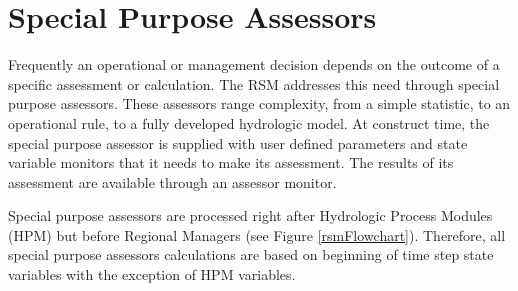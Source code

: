 \section{Special Purpose Assessors}\label{Chapter:specialPurposeAssessor}

Frequently an operational or management decision depends on the
outcome of a specific assessment or calculation.  The RSM addresses
this need through special purpose assessors.  These assessors range
complexity, from a simple statistic, to an operational rule, to a
fully developed hydrologic model.  At construct time, the special
purpose assessor is supplied with user defined parameters and state
variable monitors that it needs to make its assessment.  The results
of its assessment are available through an assessor monitor.

Special purpose assessors are processed right after Hydrologic Process
Modules (HPM) but before Regional Managers (see Figure
\ref{rsmFlowchart}).  Therefore, all special purpose assessors
calculations are based on beginning of time step state variables with
the exception of HPM variables.

